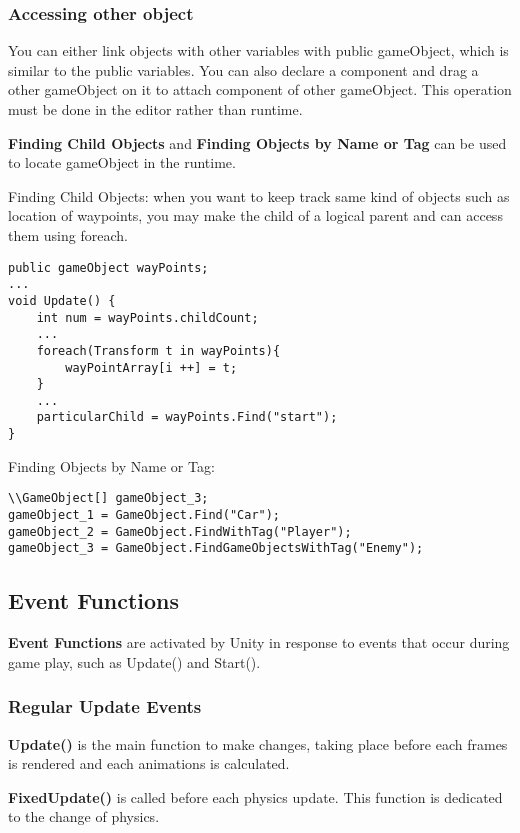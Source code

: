 \documentclass[10pt, a4paper]{article}
\begin{document}
            \subsubsection{Accessing other object} 
                You can either link objects with other variables with public gameObject, which is similar to the public variables. You can also declare a component and drag a other gameObject on it to attach component of other gameObject. This operation must be done in the editor rather than runtime. 

                \textbf{Finding Child Objects} and \textbf{Finding Objects by Name or Tag} can be used to locate gameObject in the runtime. 
                
                Finding Child Objects: when you want to keep track same kind of objects such as location of waypoints, you may make the child of a logical parent and can access them using foreach. 
\begin{lstlisting}
public gameObject wayPoints;
...
void Update() {
    int num = wayPoints.childCount;
    ... 
    foreach(Transform t in wayPoints){
        wayPointArray[i ++] = t; 
    }
    ...
    particularChild = wayPoints.Find("start"); 
}
\end{lstlisting} 

                Finding Objects by Name or Tag:
\begin{lstlisting}
\\GameObject[] gameObject_3;
gameObject_1 = GameObject.Find("Car"); 
gameObject_2 = GameObject.FindWithTag("Player");
gameObject_3 = GameObject.FindGameObjectsWithTag("Enemy");
\end{lstlisting}

        \subsection{Event Functions} 
            \textbf{Event Functions} are activated by Unity in response to events that occur during game play, such as Update() and Start().
            \subsubsection{Regular Update Events}
                \textbf{Update()} is the main function to make changes, taking place before each frames is rendered and each animations is calculated.
                
                \textbf{FixedUpdate()} is called before each physics update. This function is dedicated to the change of physics. 
\end{document}
